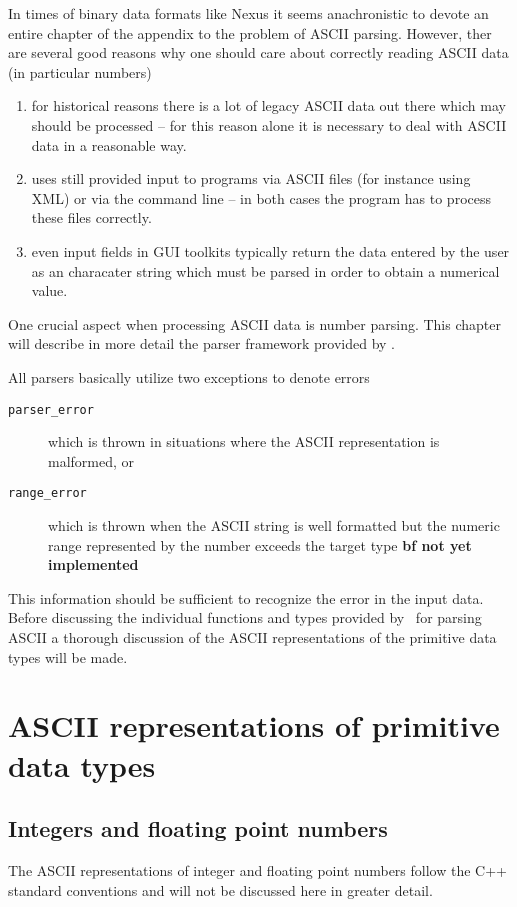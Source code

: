 
In times of binary data formats like Nexus it seems anachronistic to devote an
entire chapter of the appendix to the problem of ASCII parsing. However, 
ther are several good reasons why one should care about correctly reading 
ASCII data (in particular numbers)
\begin{enumerate}
\item for historical reasons there is a lot of legacy ASCII data out there which
may should be processed -- for this reason alone it is necessary to deal with
ASCII data in a reasonable way.
\item uses still provided input to programs via ASCII files (for instance using
XML) or via the command line -- in both cases the program has to process these
files correctly. 
\item even input fields in GUI toolkits typically return the data entered by 
the user as an characater string which must be parsed in order to obtain a 
numerical value.
\end{enumerate}

One crucial aspect when processing ASCII data is number parsing.
This chapter will describe in more detail the parser framework provided by 
\libpniio. 

All parsers basically utilize two exceptions to denote errors
\begin{description}
\item[\texttt{parser\_error}] which is thrown in situations where the ASCII 
representation is malformed, or
\item[\texttt{range\_error}] which is thrown when the ASCII string is well 
formatted but the numeric range represented by the number exceeds the 
target type \textbf{bf not yet implemented}
\end{description}
This information should be sufficient to recognize the error in the input data. 
Before discussing the individual functions and types provided by \libpniio\ 
for parsing ASCII a thorough discussion of the ASCII representations of 
the primitive data types will be made.

\section{ASCII representations of primitive data types}

\subsection{Integers and floating point numbers}
The ASCII representations of integer and floating point numbers follow the 
C++ standard conventions and will not be discussed here in greater detail.

